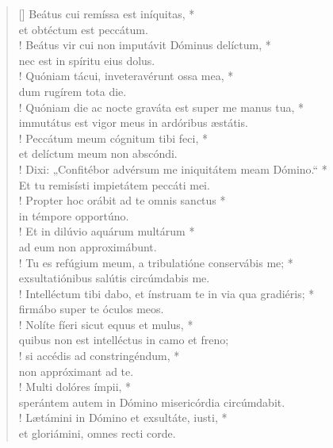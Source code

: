 \begin{verse}[\versewidth]
Beátus cui remíssa est iníquitas, *\\
et obtéctum est peccátum.\\!
\vin Beátus vir cui non imputávit Dóminus delíctum, *\\
\vin nec est in spíritu eius dolus.\\!
Quóniam tácui, inveteravérunt ossa mea, *\\
dum rugírem tota die.\\!
\vin Quóniam die ac nocte graváta est super me manus tua, *\\
\vin immutátus est vigor meus in ardóribus æstátis.\\!
Peccátum meum cógnitum tibi feci, *\\
et delíctum meum non abscóndi.\\!
\vin Dixi: „Confitébor advérsum me iniquitátem meam Dómino.“ *\\
\vin Et tu remisísti impietátem peccáti mei.\\!
Propter hoc orábit ad te omnis sanctus *\\
in témpore opportúno.\\!
\vin Et in dilúvio aquárum multárum *\\
\vin ad eum non approximábunt.\\!
Tu es refúgium meum, a tribulatióne conservábis me; *\\
exsultatiónibus salútis circúmdabis me.\\!
\vin Intelléctum tibi dabo, et ínstruam te in via qua gradiéris; *\\
\vin firmábo super te óculos meos.\\!
Nolíte fíeri sicut equus et mulus, *\\
quibus non est intelléctus in camo et freno;\\!
\vin si accédis ad constringéndum, *\\
\vin non appróximant ad te.\\!
Multi dolóres ímpii, *\\
sperántem autem in Dómino misericórdia circúmdabit.\\!
\vin Lætámini in Dómino et exsultáte, iusti, *\\
\vin et gloriámini, omnes recti corde.\\
\end{verse}
\vspace{1cm}


